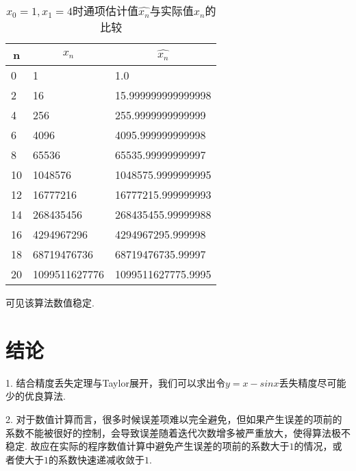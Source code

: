 \documentclass[UTF8,ctexart,a4paper,11pt,openany]{article}
\theoremstyle{definition}
\begin{document}
    \begin{table}[H]
        \centering
        \begin{tabular}{lll}
            \toprule
            \multicolumn{1}{c}{n} & \multicolumn{1}{c}{$x_n$} & \multicolumn{1}{c}{$\hat{x_n}$} \\ \midrule
            0                     &  1                      & 1.0                     \\
             2                    &  16                     & 15.999999999999998      \\
             4                    &  256                    & 255.9999999999999       \\
             6                    &  4096                   & 4095.999999999998       \\
             8                    &  65536                  & 65535.99999999997       \\
             10                   &  1048576                & 1048575.9999999995      \\
             12                   &  16777216               & 16777215.999999993      \\
             14                   &  268435456              & 268435455.99999988      \\
             16                   &  4294967296             & 4294967295.999998       \\
             18                   &  68719476736            & 68719476735.99997       \\
             20                   &  1099511627776          & 1099511627775.9995      \\ \bottomrule
        \end{tabular}
        \caption{$x_0=1,x_1=4$时通项估计值$\hat{x_n}$与实际值$x_n$的比较}
        \label{tab:my-table}
    \end{table}
    可见该算法数值稳定.
\section{结论}
    1. 结合精度丢失定理与Taylor展开，我们可以求出令$y=x-sinx$丢失精度尽可能少的优良算法.\par
\vspace{10pt}
    2. 对于数值计算而言，很多时候误差项难以完全避免，但如果产生误差的项前的系数不能被很好的控制，会导致误差随着迭代次数增多被严重放大，使得算法极不稳定. 故应在实际的程序数值计算中避免产生误差的项前的系数大于$1$的情况，或者使大于$1$的系数快速递减收敛于$1$. 
\end{document}
